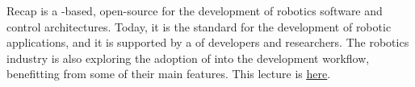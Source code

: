 
\begin{frame}{Recap}
   is a -based, open-source  for the development of robotics software and  control architectures.
  \newline\newline
  Today, it is the  standard for the development of robotic applications, and it is supported by a  of developers and researchers.
  \newline\newline
  The robotics industry is also exploring the adoption of  into the development workflow, benefitting from some of their main features.
  \newline\newline
  This lecture is \href{https://github.com/robmasocco/DAFN23_Robotics_2}{\color{blue}\underline{here}}.
\end{frame}
